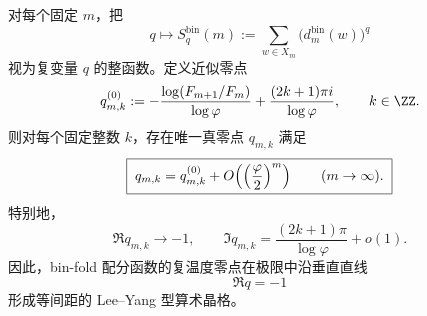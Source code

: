 \begin{theorem}[bin-fold 幂和配分函数的复温度零点在 \texorpdfstring{$\Re q=-1$}{Re q=-1} 上形成算术晶格]\label{thm:xi-foldbin-complex-temperature-zero-lattice}
对每个固定 \(m\)，把
\[
q\longmapsto S_q^{\mathrm{bin}}(m):=\sum_{w\in X_m}\bigl(d_m^{\mathrm{bin}}(w)\bigr)^q
\]
视为复变量 \(q\) 的整函数。定义近似零点
\[
q_{m,k}^{(0)}
:=
-\frac{\log(F_{m+1}/F_m)}{\log\varphi}
+\frac{(2k+1)\pi i}{\log\varphi},
\qquad k\in\ZZ.
\]
则对每个固定整数 \(k\)，存在唯一真零点 \(q_{m,k}\) 满足
\[
\boxed{\;
q_{m,k}=q_{m,k}^{(0)}+O\!\left(\Bigl(\frac{\varphi}{2}\Bigr)^m\right)
\qquad (m\to\infty).\;}
\]
特别地，
\[
\boxed{\;
\Re q_{m,k}\to -1,
\qquad
\Im q_{m,k}=\frac{(2k+1)\pi}{\log\varphi}+o(1).\;}
\]
因此，bin-fold 配分函数的复温度零点在极限中沿垂直直线
\[
\boxed{\ \Re q=-1\ }
\]
形成等间距的 Lee--Yang 型算术晶格。
\end{theorem}
